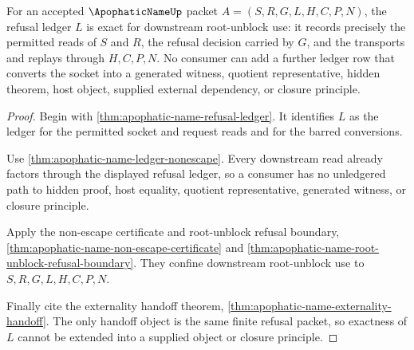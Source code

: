 \begin{theorem}
\label{thm:apophatic-name-refusal-ledger-exactness}
For an accepted $\ApophaticNameUp$ packet $A=(S,R,G,L,H,C,P,N)$, the refusal ledger $L$ is exact for downstream root-unblock use: it records precisely the permitted reads of $S$ and $R$, the refusal decision carried by $G$, and the transports and replays through $H,C,P,N$. No consumer can add a further ledger row that converts the socket into a generated witness, quotient representative, hidden theorem, host object, supplied external dependency, or closure principle.
\end{theorem}
\begin{proof}
Begin with \autoref{thm:apophatic-name-refusal-ledger}. It identifies $L$ as the ledger for the permitted socket and request reads and for the barred conversions.

Use \autoref{thm:apophatic-name-ledger-nonescape}. Every downstream read already factors through the displayed refusal ledger, so a consumer has no unledgered path to hidden proof, host equality, quotient representative, generated witness, or closure principle.

Apply the non-escape certificate and root-unblock refusal boundary, \autoref{thm:apophatic-name-non-escape-certificate} and \autoref{thm:apophatic-name-root-unblock-refusal-boundary}. They confine downstream root-unblock use to $S,R,G,L,H,C,P,N$.

Finally cite the externality handoff theorem, \autoref{thm:apophatic-name-externality-handoff}. The only handoff object is the same finite refusal packet, so exactness of $L$ cannot be extended into a supplied object or closure principle.
\end{proof}

